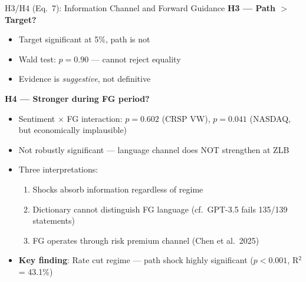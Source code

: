 \documentclass[aspectratio=169, 11pt]{beamer}
\begin{document}
\begin{frame}{H3/H4 (Eq.~7): Information Channel and Forward Guidance}
\textbf{H3 --- Path $>$ Target?}
\begin{itemize}
  \item Target significant at 5\%, path is not
  \item Wald test: $p = 0.90$ --- cannot reject equality
  \item Evidence is \textit{suggestive}, not definitive
\end{itemize}

\vspace{0.8em}
\textbf{H4 --- Stronger during FG period?}
\begin{itemize}
  \item Sentiment $\times$ FG interaction: $p = 0.602$ (CRSP VW), $p = 0.041$ (NASDAQ, but economically implausible)
  \item \alert{Not robustly significant} --- language channel does NOT strengthen at ZLB
  \item Three interpretations:
    \begin{enumerate}
      \item Shocks absorb information regardless of regime
      \item Dictionary cannot distinguish FG language (cf.\ GPT-3.5 fails 135/139 statements)
      \item FG operates through risk premium channel (Chen et al.\ 2025)
    \end{enumerate}
  \item \textbf{Key finding}: Rate cut regime --- path shock \alert{highly significant} ($p < 0.001$, R$^2$ = 43.1\%)
\end{itemize}
\end{frame}
\end{document}
